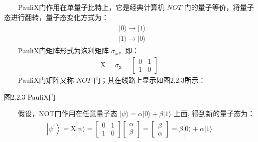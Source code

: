 \documentclass[a4paper,11pt,english]{sphinxmanual}
\begin{document}
\sphinxAtStartPar
  Pauli\sphinxhyphen{}X门作用在单量子比特上，它是经典计算机 \(NOT\) 门的量子等价，将量子态进行翻转，量子态变化方式为：
\begin{equation*}
\begin{split}\begin{aligned} &|0\rangle \rightarrow|1\rangle \\ &|1\rangle \rightarrow|0\rangle \end{aligned}\end{split}
\end{equation*}
\sphinxAtStartPar
  Pauli\sphinxhyphen{}X门矩阵形式为泡利矩阵 \(\sigma_{x}\) ​，即：
\begin{equation*}
\begin{split}\mathrm{X}=\sigma_{\mathrm{x}}=\left[\begin{array}{ll} 0 & 1 \\ 1 & 0 \end{array}\right]\end{split}
\end{equation*}
\sphinxAtStartPar
  Pauli\sphinxhyphen{}X门矩阵又称 \(NOT\) 门；其在线路上显示如图2.2.3所示：


\begin{center}图2.2.3 Pauli\sphinxhyphen{}X门
\end{center}
\sphinxAtStartPar
  假设，NOT门作用在任意量子态 \(|\psi\rangle=\alpha|0\rangle+\beta|1\rangle\) 上面, 得到新的量子态为：
\begin{equation*}
\begin{split}\left|\psi^{\prime}\right\rangle=\mathrm{X}|\psi\rangle=\left[\begin{array}{ll} 0 & 1 \\ 1 & 0 \end{array}\right]\left[\begin{array}{l} \alpha \\ \beta \end{array}\right]=\left[\begin{array}{l} \beta \\ \alpha \end{array}\right]=\beta|0\rangle+\alpha|1\rangle\end{split}
\end{equation*}
\sphinxAtStartPar
{}
\end{document}
